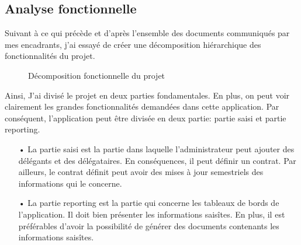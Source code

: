 \documentclass[a4paper]{report}
\begin{document}
\begin{doublespace}
	\section{Analyse fonctionnelle}
	Suivant à ce qui précède et d’après l’ensemble des documents communiqués par mes encadrants, j’ai essayé de créer une décomposition hiérarchique des fonctionnalités du projet.
	\begin{figure}[H]
		\begin{center}
			\caption{Décomposition fonctionnelle du projet}
		\end{center}
	\end{figure}
	Ainsi, J'ai divisé le projet en deux parties fondamentales. En plus, on peut voir clairement les grandes fonctionnalités demandées dans cette application. Par conséquent, l'application peut être divisée en deux partie: partie saisi et partie reporting.
	\begin{itemize}
		\item[•] La partie saisi est la partie dans laquelle l'administrateur peut ajouter des délégants et des délégataires. En conséquences, il peut définir un contrat. Par ailleurs, le contrat définit peut avoir des mises à jour semestriels des informations qui le concerne.
		\item[•] La partie reporting est la partie qui concerne les tableaux de bords de l’application. Il doit bien présenter les informations saisîtes. En plus, il est préférables d'avoir la possibilité de générer des documents contenants les informations saisîtes.
	\end{itemize}

\end{doublespace}
\end{document}
